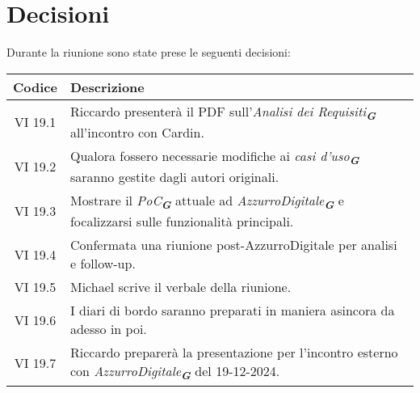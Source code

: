 
\section{Decisioni}

Durante la riunione sono state prese le seguenti decisioni:

\vspace{0.5cm}

\begin{table}[htbp]
    \centering
    \begin{tabular}{|c|p{}|}
        \hline
        \rowcolor[gray]{0.75}
        \textbf{Codice} & \textbf{Descrizione}\\
        \hline
        VI 19.1 & Riccardo presenterà il PDF sull'\emph{Analisi dei Requisiti}\textsubscript{\textit{\textbf{G}}} all’incontro con Cardin.\\
        \hline
        VI 19.2 & Qualora fossero necessarie modifiche ai \emph{casi d'uso}\textsubscript{\textit{\textbf{G}}} saranno gestite dagli autori originali.\\
        \hline
        VI 19.3 & Mostrare il \emph{PoC}\textsubscript{\textit{\textbf{G}}} attuale ad \emph{AzzurroDigitale}\textsubscript{\textit{\textbf{G}}} e focalizzarsi sulle funzionalità principali.\\
        \hline
        VI 19.4 & Confermata una riunione post-AzzurroDigitale per analisi e follow-up.\\
        \hline
        VI 19.5 & Michael scrive il verbale della riunione.\\
        \hline
        VI 19.6 & I diari di bordo saranno preparati in maniera asincora da adesso in poi.\\
        \hline
        VI 19.7 & Riccardo preparerà la presentazione per l'incontro esterno con \emph{AzzurroDigitale}\textsubscript{\textit{\textbf{G}}} del 19-12-2024.\\
        \hline
    \end{tabular}
\end{table}
